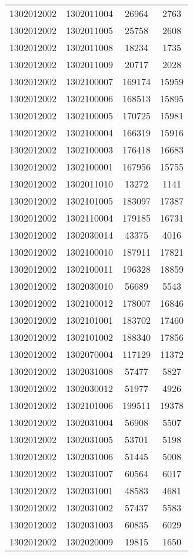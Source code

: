 \begin{longtable}{llcc}
1302012002 & 1302011004 & 26964 & 2763\\
1302012002 & 1302011005 & 25758 & 2608\\
1302012002 & 1302011008 & 18234 & 1735\\
1302012002 & 1302011009 & 20717 & 2028\\
1302012002 & 1302100007 & 169174 & 15959\\
1302012002 & 1302100006 & 168513 & 15895\\
1302012002 & 1302100005 & 170725 & 15981\\
1302012002 & 1302100004 & 166319 & 15916\\
1302012002 & 1302100003 & 176418 & 16683\\
1302012002 & 1302100001 & 167956 & 15755\\
1302012002 & 1302011010 & 13272 & 1141\\
1302012002 & 1302101005 & 183097 & 17387\\
1302012002 & 1302110004 & 179185 & 16731\\
1302012002 & 1302030014 & 43375 & 4016\\
1302012002 & 1302100010 & 187911 & 17821\\
1302012002 & 1302100011 & 196328 & 18859\\
1302012002 & 1302030010 & 56689 & 5543\\
1302012002 & 1302100012 & 178007 & 16846\\
1302012002 & 1302101001 & 183702 & 17460\\
1302012002 & 1302101002 & 188340 & 17856\\
1302012002 & 1302070004 & 117129 & 11372\\
1302012002 & 1302031008 & 57477 & 5827\\
1302012002 & 1302030012 & 51977 & 4926\\
1302012002 & 1302101006 & 199511 & 19378\\
1302012002 & 1302031004 & 56908 & 5507\\
1302012002 & 1302031005 & 53701 & 5198\\
1302012002 & 1302031006 & 51445 & 5008\\
1302012002 & 1302031007 & 60564 & 6017\\
1302012002 & 1302031001 & 48583 & 4681\\
1302012002 & 1302031002 & 57437 & 5583\\
1302012002 & 1302031003 & 60835 & 6029\\
1302012002 & 1302020009 & 19815 & 1650\\

\end{longtable}
